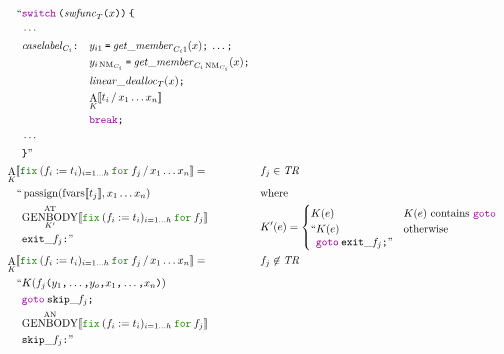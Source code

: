 \documentclass[a4paper,fleqn]{article}
\newcommand{\kwfix}{\mbox{\color{mygreen}\ttfamily fix}}
\newcommand{\kwfor}{\mbox{\color{mygreen}\ttfamily for}}
\newcommand{\fix}[4]{\kwfix\:(#1 := #2)_{#3}\:\kwfor\:#4}
\DeclareMathOperator{\NM}{NM} %
\newcommand{\BRA}[1]{\llbracket #1 \rrbracket}
\DeclareMathOperator{\genbody}{GENBODY}
\newcommand{\genbodyat}[2]{\genbody^\mathrm{AT}_{#1}\BRA{#2}}
\newcommand{\genbodyan}[1]{\genbody^\mathrm{AN}\BRA{#1}}
\newcommand{\tr}{\mathit{TR}}
\newcommand{\ldq}{\text{``}}
\newcommand{\rdq}{\text{''}}
\newcommand{\ttparen}[1]{\texttt{(}#1\texttt{)}}
\newcommand{\ttlbrace}{\texttt{\char '173}}
\newcommand{\ttrbrace}{\texttt{\char '175}}
\newcommand{\tteq}{\texttt{=}}
\newcommand{\ttsemi}{\texttt{;}}
\newcommand{\ttcomma}{\texttt{,}}
\newcommand{\ttcolon}{\texttt{:}}
\newcommand{\kwswitch}{\mbox{\color{myviolet}\ttfamily switch}}
\newcommand{\kwbreak}{\mbox{\color{myviolet}\ttfamily break}}
\newcommand{\kwgoto}{\mbox{\color{myviolet}\ttfamily goto}}
\DeclareMathOperator{\passign}{passign}
\DeclareMathOperator{\fvarsop}{fvars}
\newcommand{\fvars}[1]{\fvarsop\BRA{#1}}
\DeclareMathOperator{\Aop}{A}
\newcommand{\A}[3]{\Aop_{#1}\BRA{#2\,/\,#3}}
\begin{document}
\begin{align*}
     & \quad\begin{alignedat}{2}
       \ldq & \kwswitch\:\ttparen{\mathit{swfunc}_T\ttparen{x}}\:\ttlbrace \\
            & \cdots \\
            & \mathit{caselabel}_{C_i}\ttcolon\quad
              \begin{aligned}[t]
              & y_{i1}\:\tteq\:\mathit{get\_member}_{C_i1}(x)\ttsemi \:\ldots\ttsemi \\
              & y_{i\NM_{C_i}}\:\tteq\:\mathit{get\_member}_{C_i\NM_{C_i}}(x)\ttsemi \\
              & \mathit{linear\_dealloc}_{T}(x)\ttsemi \\
              & {\A{K}{t_i}{x_1\ldots x_n}} \\
              & \kwbreak\ttsemi
              \end{aligned} \\
            & \cdots \\
            & \ttrbrace\rdq
       \end{alignedat} \\
  &\A{K}{\fix{f_i}{t_i}{i=1\ldots h}{f_j}}{x_1\ldots x_n} =                   && f_j \in \tr \\
     & \quad\begin{alignedat}[t]{2}
       \ldq & \passign(\fvars{t_j}, x_1\ldots x_n) \\
            & {\genbodyat{K'}{\fix{f_i}{t_i}{i=1\ldots h}{f_j}}} \\
            & \mathtt{exit\_}f_j\ttcolon \rdq
       \end{alignedat} &&
               \begin{alignedat}[t]{1}
                  & \text{where} \\
                  & K'(e) =
                    \begin{cases}
                    K(e) & \text{$K(e)$ contains \kwgoto}  \\
                    \begin{aligned}[t]
                      \ldq & K(e) \\
                           & \kwgoto\:\mathtt{exit\_}f_j\ttsemi \rdq
                    \end{aligned} & \text{otherwise}
                  \end{cases}
                \end{alignedat} \\
  &\A{K}{\fix{f_i}{t_i}{i=1\ldots h}{f_j}}{x_1\ldots x_n} =                      && f_j \not\in \tr \\
     & \quad\begin{alignedat}[t]{2}
       \ldq & K(f_j\ttparen{y_1\ttcomma\dotsc\ttcomma y_o\ttcomma x_1\ttcomma\dotsc\ttcomma x_n})                  \\
            & \kwgoto\:\mathtt{skip\_}f_j\ttsemi                                    \\
            & {\genbodyan{\fix{f_i}{t_i}{i=1\ldots h}{f_j}}}                          \\
            & \mathtt{skip\_}f_j\ttcolon \rdq
       \end{alignedat}
\end{align*}
\end{document}
